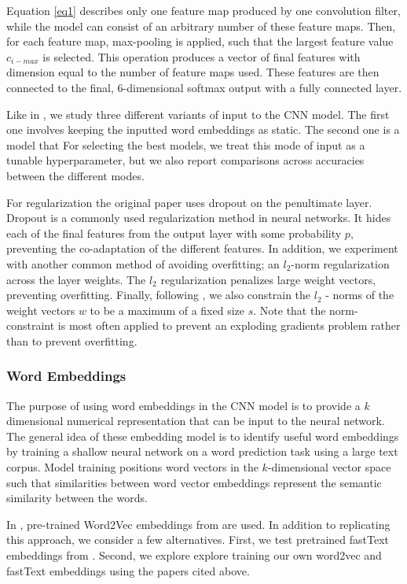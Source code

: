 \documentclass[conference]{IEEEtran}
\begin{document}
Equation \eqref{eq1} describes only one feature map produced by one convolution filter, while the model can consist of an arbitrary number of these feature maps. Then, for each feature map, max-pooling is applied, such that the largest feature value $c_{i-max}$ is selected. This operation produces a vector of final features with dimension equal to the number of feature maps used. These features are then connected to the final, 6-dimensional softmax output with a fully connected layer.

Like in \cite{kim-2014-convolutional}, we study three different variants of input to the CNN model. The first one involves keeping the inputted word embeddings as static. The second one is a model that For selecting the best models, we treat this mode of input as a tunable hyperparameter, but we also report comparisons across accuracies between the different modes.

For regularization the original paper uses dropout on the penultimate layer. Dropout is a commonly used regularization method in neural networks. It hides each of the final features from the output layer with some probability $p$, preventing the co-adaptation of the different features. In addition, we experiment with another common method of avoiding overfitting; an $l_2$-norm regularization across the layer weights. The $l_2$ regularization penalizes large weight vectors, preventing overfitting.  Finally, following \cite{kim-2014-convolutional}, we also constrain the $l_2$ - norms of the weight vectors $w$ to be a maximum of a fixed size $s$. Note that the norm-constraint is most often applied to prevent an exploding gradients problem rather than to prevent overfitting.

\subsubsection{Word Embeddings}
The purpose of using word embeddings in the CNN model is to provide a $k$ dimensional numerical representation that can be input to the neural network. The general idea of these embedding model is to identify useful word embeddings by training a shallow neural network on a word prediction task using a large text corpus. Model training positions word vectors in the $k$-dimensional vector space such that similarities between word vector embeddings represent the semantic similarity between the words.

In \cite{kim-2014-convolutional}, pre-trained Word2Vec embeddings from \cite{mikolov2013distributed, mikolov2013efficient} are used. In addition to replicating this approach, we consider a few alternatives. First, we test pretrained fastText embeddings from \cite{bojanowski2016enriching, joulin2016bag}. Second, we explore explore training our own word2vec and fastText embeddings using the papers cited above.
\end{document}
